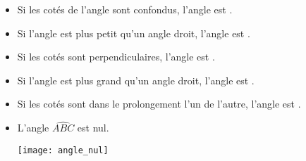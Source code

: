 \begin{mydefs}
	\begin{itemize}
		\item Si les cotés de l'angle sont confondus, l'angle est .
		
		
		\item Si l'angle est plus petit qu'un angle droit, l'angle est .
		
		\item Si les cotés sont perpendiculaires, l'angle est .
		
		\item Si l'angle est plus grand qu'un angle droit, l'angle est .		
		
		\item Si les cotés sont dans le prolongement l'un de l'autre, l'angle est .
	\end{itemize}
\end{mydefs}

\begin{myexs}
	\begin{itemize}
		
			

	
		\item L'angle $\widehat{ABC}$ est nul.
			\begin{center}
				\texttt{[image: angle\_nul]}
			\end{center}
		
	\end{itemize}
\end{myexs}